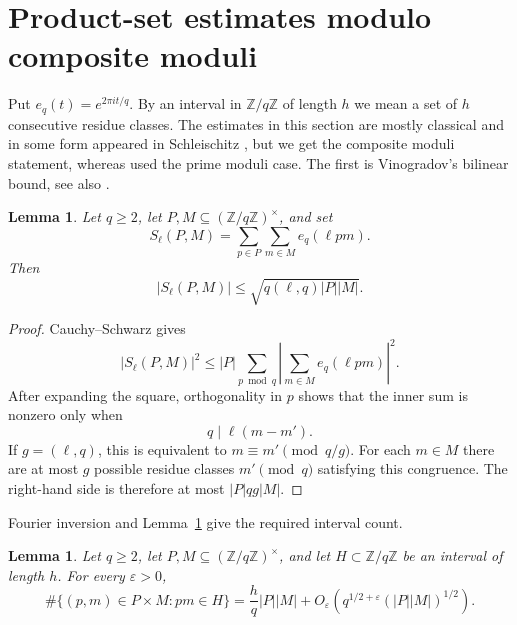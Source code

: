 \documentclass[11pt]{amsart}
\newtheorem{lemma}[theorem]{Lemma}
\newcommand{\Z}{\mathbb Z}
\newcommand{\eps}{\varepsilon}
\begin{document}
\section{Product-set estimates modulo composite moduli}\label{sec:hitting}

Put $e_q(t)=e^{2\pi i t/q}$.  By an interval in $\Z/q\Z$ of length $h$ we
mean a set of $h$ consecutive residue classes.  The estimates in this section are mostly classical and in some form appeared in Schleischitz \cite{SchleischitzULC}, but we get the composite moduli statement, whereas \cite{SchleischitzULC} used the prime moduli case.  The first is Vinogradov's bilinear bound, see also
\cite[Ch.~VI]{Vinogradov}.

\begin{lemma}\label{lem:bilinear}
Let $q\ge2$, let $P,M\subseteq(\Z/q\Z)^\times$, and set
$$
 S_\ell(P,M)=\sum_{p\in P}\sum_{m\in M}e_q(\ell pm).
$$
Then
$$
 |S_\ell(P,M)|\le \sqrt{q(\ell,q)|P||M|}.
$$
\end{lemma}

\begin{proof}
Cauchy--Schwarz gives
$$
 |S_\ell(P,M)|^2
 \le |P|\sum_{p\bmod q}
 \left|\sum_{m\in M}e_q(\ell pm)\right|^2.
$$
After expanding the square, orthogonality in $p$ shows that the inner sum is
nonzero only when
$$
 q\mid \ell(m-m').
$$
If $g=(\ell,q)$, this is equivalent to
$m\equiv m'\pmod{q/g}$.  For each $m\in M$ there are at most $g$ possible
residue classes $m'\pmod q$ satisfying this congruence.  The right-hand side
is therefore at most $|P|qg|M|$.
\end{proof}

Fourier inversion and Lemma~\ref{lem:bilinear} give the required interval count.

\begin{lemma}\label{lem:bilinear-count}
Let $q\ge2$, let $P,M\subseteq(\Z/q\Z)^\times$, and let
$H\subset\Z/q\Z$ be an interval of length $h$.  For every $\eps>0$,
\begin{equation}\label{eq:bilinear-count}
 \#\{(p,m)\in P\times M:pm\in H\}
 =\frac{h}{q}|P||M|
 +O_\eps\left(q^{1/2+\eps}(|P||M|)^{1/2}\right).
\end{equation}
\end{lemma}
\end{document}
